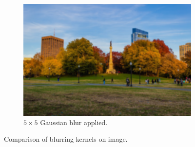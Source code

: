 \documentclass{article}
\begin{document}
\begin{example}
\begin{figure}[H]
\begin{subfigure}[b]{0.32\textwidth}
            \includegraphics[width=\textwidth]{img/Gaussian_Blur.png}
            \caption{$5 \times 5$ Gaussian blur applied. }
            \label{fig:Gaussian_Blur}
        \end{subfigure}

        \caption{Comparison of blurring kernels on image. }
        \label{fig:blur}
      \end{figure}
    \end{example}
\end{document}
